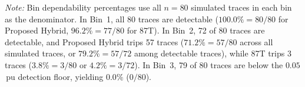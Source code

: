 \begin{table}[H]\centering\caption{High-impedance internal fault sensitivity by resistance bin ($n = 80$ traces per bin).}\label{tab:6.6}
\vspace{3pt}\raggedright\footnotesize\textit{Note:} Bin dependability percentages use all $n = 80$ simulated traces in each bin as the denominator. In Bin~1, all 80 traces are detectable ($100.0\% = 80/80$ for Proposed Hybrid, $96.2\% = 77/80$ for 87T). In Bin~2, 72 of 80 traces are detectable, and Proposed Hybrid trips 57 traces ($71.2\% = 57/80$ across all simulated traces, or $79.2\% = 57/72$ among detectable traces), while 87T trips 3 traces ($3.8\% = 3/80$ or $4.2\% = 3/72$). In Bin~3, 79 of 80 traces are below the $0.05$\,pu detection floor, yielding $0.0\%$ ($0/80$).
\end{table}